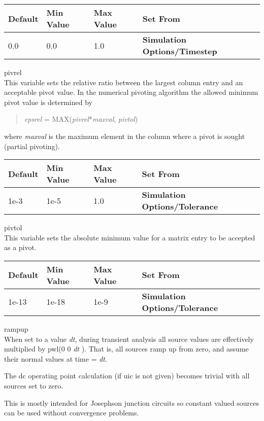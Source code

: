 \begin{description}
\begin{tabular}{|l|l|l|l|}\hline
\bf Default & \bf Min Value & \bf Max Value & \bf Set From\\ \hline
0.0 & 0.0 & 1.0 & \bf Simulation Options/Timestep\\ \hline
\end{tabular}

\item{\et pivrel}\\
This variable sets the relative ratio between the largest column entry
and an acceptable pivot value.  In the numerical pivoting algorithm
the allowed minimum pivot value is determined by
\begin{quote}
{\it epsrel} = MAX({\it pivrel\/}*{\it maxval\/}, {\it pivtol\/})
\end{quote}
where {\it maxval} is the maximum element in the column where a pivot
is sought (partial pivoting).

\begin{tabular}{|l|l|l|l|}\hline
\bf Default & \bf Min Value & \bf Max Value & \bf Set From\\ \hline
1e-3 & 1e-5 & 1.0 & \bf Simulation Options/Tolerance\\ \hline
\end{tabular}
 
\item{\et pivtol}\\
This variable sets the absolute minimum value for a matrix entry to be
accepted as a pivot.

\begin{tabular}{|l|l|l|l|}\hline
\bf Default & \bf Min Value & \bf Max Value & \bf Set From\\ \hline
1e-13 & 1e-18 & 1e-9 & \bf Simulation Options/Tolerance\\ \hline
\end{tabular}
 
\item{\et rampup}\\
When set to a value {\it dt\/}, during transient analysis all source
values are effectively multiplied by {\vt pwl(0 0} {\it dt} {)}. 
That is, all sources ramp up from zero, and assume their normal values
at time = {\it dt\/}.

The dc operating point calculation (if {\vt uic} is not given) 
becomes trivial with all sources set to zero.

This is mostly intended for Josephson junction circuits so constant
valued sources can be used without convergence problems.
 

\end{description}
